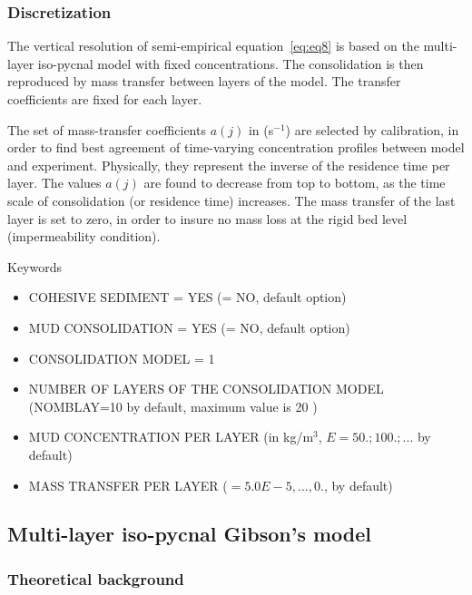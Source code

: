 \subsubsection*{Discretization}

The vertical resolution of semi-empirical equation~\ref{eq:eq8} is based on the
multi-layer iso-pycnal model with fixed concentrations. The consolidation is
then reproduced by mass transfer between layers of the model. The transfer
coefficients are fixed for each layer.

The set of mass-transfer coefficients $a(j)$ in (s$^{-1}$) are selected by
calibration, in order to find best agreement of time-varying concentration
profiles between model and experiment. Physically, they represent the
inverse of the residence time per layer. The values $a(j)$ are found to
decrease from top to bottom, as the time scale of consolidation (or
residence time) increases. The mass transfer of the last layer is set to
zero, in order to insure no mass loss at the rigid bed level (impermeability
condition).

\medskip
\begin{bclogo}[couleur=blue!10,arrondi=0.1, logo=\bcinfo]{Keywords}
\begin{itemize}
\item {\ttfamily COHESIVE SEDIMENT = YES} ({\ttfamily = NO}, default option)
\item {\ttfamily MUD CONSOLIDATION = YES} ({\ttfamily = NO}, default option)
\item {\ttfamily CONSOLIDATION MODEL = 1} 
\item {\ttfamily NUMBER OF LAYERS OF THE CONSOLIDATION MODEL} ({\ttfamily NOMBLAY=10} by default, maximum value is 20 )
\item {\ttfamily MUD CONCENTRATION PER LAYER} (in kg/m$^3$, $E= 50.; 100.;...$ by default)
\item {\ttfamily MASS TRANSFER PER LAYER} ($= 5.0E-5,...,0.$, by default)
\end{itemize}
\end{bclogo}

\subsection{Multi-layer iso-pycnal Gibson's model}\label{sec:4.3}

\subsubsection{Theoretical background}

